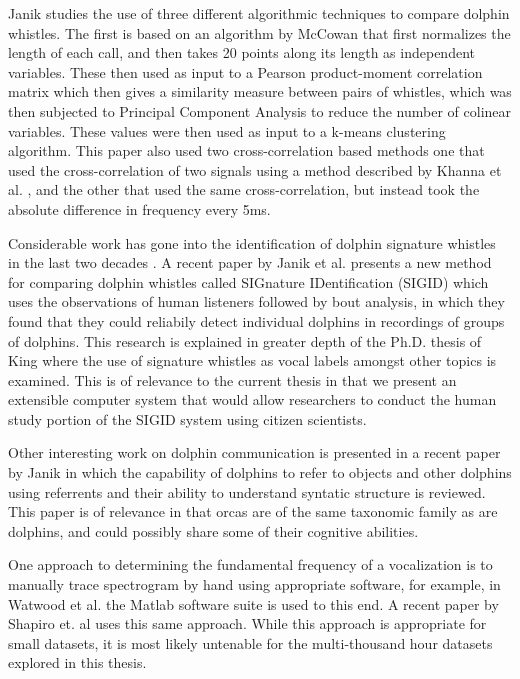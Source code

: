 \documentclass[12pt,oneside]{book}
\begin{document}
Janik \cite{janik99} studies the use of three different algorithmic
techniques to compare dolphin whistles.  The first is based on an
algorithm by McCowan \cite{mccowan95} that first normalizes the length
of each call, and then takes 20 points along its length as independent
variables.  These then used as input to a Pearson product-moment
correlation matrix which then gives a similarity measure between pairs
of whistles, which was then subjected to Principal Component Analysis
to reduce the number of colinear variables.  These values were then
used as input to a k-means clustering algorithm.  This paper also used
two cross-correlation based methods one that used the
cross-correlation of two signals using a method described by Khanna et
al. \cite{khanna97}, and the other that used the same
cross-correlation, but instead took the absolute difference in
frequency every 5ms.

Considerable work has gone into the identification of dolphin
signature whistles in the last two decades \cite{sayigh90}.  A recent
paper by Janik et al. \cite{janik12} presents a new method for
comparing dolphin whistles called SIGnature IDentification (SIGID)
which uses the observations of human listeners followed by bout
analysis, in which they found that they could reliabily detect
individual dolphins in recordings of groups of dolphins.  This
research is explained in greater depth of the Ph.D. thesis of King
\cite{king12} where the use of signature whistles as vocal labels
amongst other topics is examined.  This is of relevance to the current
thesis in that we present an extensible computer system that would
allow researchers to conduct the human study portion of the SIGID
system using citizen scientists.

Other interesting work on dolphin communication is presented in a
recent paper by Janik \cite{janik2013cognitive} in which the
capability of dolphins to refer to objects and other dolphins using
referrents and their ability to understand syntatic structure is
reviewed.  This paper is of relevance in that orcas are of the same
taxonomic family as are dolphins, and could possibly share some of
their cognitive abilities.


One approach to determining the fundamental frequency of a
vocalization is to manually trace spectrogram by hand using
appropriate software, for example, in Watwood et al. \cite{watwood04}
the Matlab software suite is used to this end.  A recent paper by
Shapiro et. al \cite{shapiro06} uses this same approach.  While this
approach is appropriate for small datasets, it is most likely
untenable for the multi-thousand hour datasets explored in this
thesis.
\end{document}
